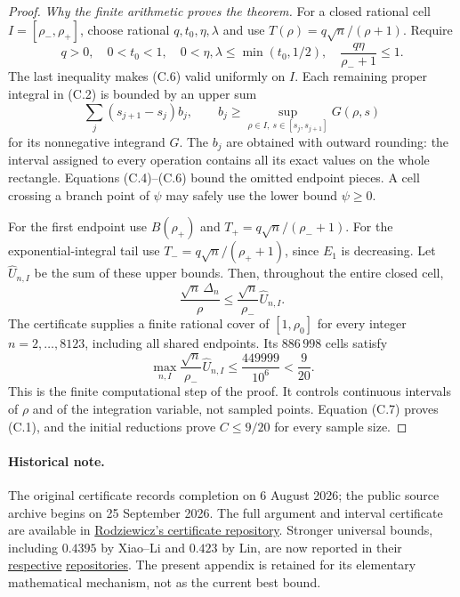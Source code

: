 \documentclass[11pt,a4paper]{article}
\numberwithin{equation}{section}
\theoremstyle{definition}
\theoremstyle{remark}
\newcommand{\D}{\Delta_n}
\begin{document}
\begin{proof}
\emph{Why the finite arithmetic proves the theorem.}
For a closed rational cell \(I=[\rho_-,\rho_+]\), choose rational
\(q,t_0,\eta,\lambda\) and use \(T(\rho)=q\sqrt n/(\rho+1)\).
Require
\[
 q>0,\quad 0<t_0<1,\quad
 0<\eta,\lambda\le\min(t_0,1/2),\quad
 \frac{q\eta}{\rho_-+1}\le1.
\]
The last inequality makes (C.6) valid uniformly on \(I\).
Each remaining proper integral in (C.2) is bounded by an upper sum
\[
 \sum_j(s_{j+1}-s_j)b_j,\qquad
 b_j\ge\sup_{\rho\in I,\ s\in[s_j,s_{j+1}]}G(\rho,s)
\]
for its nonnegative integrand \(G\). The \(b_j\) are obtained with outward
rounding: the interval assigned to every operation contains all its exact
values on the whole rectangle. Equations (C.4)--(C.6) bound the omitted
endpoint pieces. A cell crossing a branch point of \(\psi\) may safely use
the lower bound \(\psi\ge0\).

For the first endpoint use \(B(\rho_+)\) and
\(T_+=q\sqrt n/(\rho_-+1)\). For the exponential-integral tail use
\(T_-=q\sqrt n/(\rho_++1)\), since \(E_1\) is decreasing.
Let \(\widehat U_{n,I}\) be the sum of these upper bounds.
Then, throughout the entire closed cell,
\[
 \frac{\sqrt n\,\D}{\rho}
 \le\frac{\sqrt n}{\rho_-}\widehat U_{n,I}.                \tag{C.7}
\]
The certificate supplies a finite rational cover of \([1,\rho_0]\)
for every integer \(n=2,\ldots,8123\), including all shared endpoints.
Its \(886\,998\) cells satisfy
\[
 \max_{n,I}\frac{\sqrt n}{\rho_-}\widehat U_{n,I}
 \le\frac{449999}{10^6}<\frac9{20}.
\]
This is the finite computational step of the proof.
It controls continuous intervals of \(\rho\) and of the integration
variable, not sampled points. Equation (C.7) proves (C.1), and the initial
reductions prove \(C\le9/20\) for every sample size.
\end{proof}

\paragraph{Historical note.}
The original certificate records completion on 6 August 2026;
the public source archive begins on 25 September 2026.
The full argument and interval certificate are available in
\href{https://github.com/rodziewiczk/berry-esseen-045-certificate}
{Rodziewicz's certificate repository}.
Stronger universal bounds, including \(0.4395\) by Xiao--Li and \(0.423\)
by Lin, are now reported in their
\href{https://github.com/haonan-xiao/iid-berry-esseen}{respective}
\href{https://github.com/CoolRmal/BerryEsseen}{repositories}.
The present appendix is retained for its elementary mathematical mechanism,
not as the current best bound.
\end{document}
